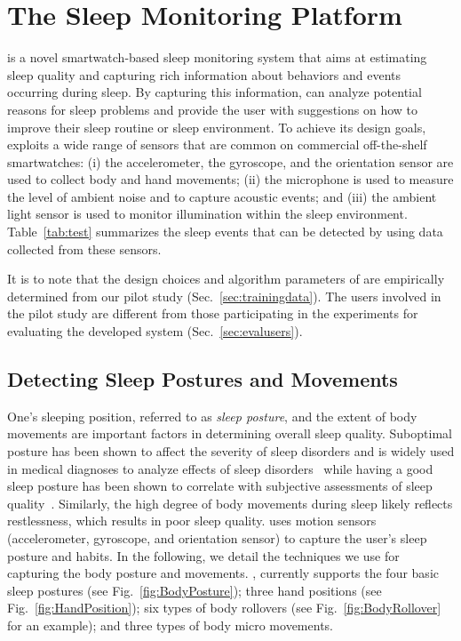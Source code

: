 \section{The {\systemname} Sleep Monitoring Platform}\label{Sec:2design}

{\systemname} is a novel smartwatch-based sleep monitoring system that aims at estimating sleep quality and capturing rich information
about behaviors and events occurring during sleep. By capturing this information, {\systemname} can analyze potential reasons for sleep
problems and provide the user with suggestions on how to improve their sleep routine or sleep environment. To achieve its design goals,
{\systemname} exploits a wide range of sensors that are common on commercial off-the-shelf smartwatches: (i) the accelerometer, the
gyroscope, and the orientation sensor are used to collect body and hand movements; (ii) the microphone is used to measure the level of
ambient noise and to capture acoustic events; and (iii) the ambient light sensor is used to monitor illumination within the sleep
environment. Table~\ref{tab:test} summarizes the sleep events that can be detected by \systemname using data collected from these sensors.

It is to note that the design choices and algorithm parameters of \systemname are empirically determined from our pilot study
(Sec.~\ref{sec:trainingdata}). The users involved in the pilot study are different from those participating in the experiments for evaluating the developed system (Sec.~\ref{sec:evalusers}).


\subsection{Detecting Sleep Postures and Movements}

One's sleeping position, referred to as {\em sleep posture}, and the extent of body movements are important factors in determining overall
sleep quality. Suboptimal posture has been shown to affect the severity of sleep disorders and is widely used in medical diagnoses to
analyze effects of sleep disorders~\cite{oksenberg1998effect,eiseman2012impact} while having a good sleep posture has been shown to
correlate with subjective assessments of sleep quality~\cite{dekoninck83sleep}. Similarly, the high degree of body movements during sleep
likely reflects restlessness, which results in poor sleep quality. {\systemname} uses motion sensors (accelerometer, gyroscope, and
orientation sensor) to capture the user's sleep posture and habits. In the following, we detail the techniques we use for capturing the
body posture and movements.  {\systemname}, currently supports the four basic sleep postures (see Fig.~\ref{fig:BodyPosture}); three hand
positions (see Fig.~\ref{fig:HandPosition}); six types of body rollovers (see Fig.~\ref{fig:BodyRollover} for an example); and three types
of body micro movements.

